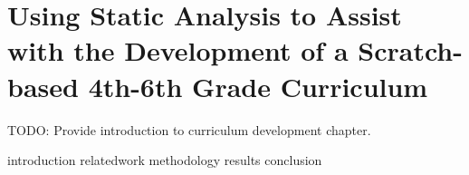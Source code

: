 \chapter{Using Static Analysis to Assist with the Development of a
  Scratch-based 4th-6th Grade Curriculum}
\label{chap:curriculum}

\def\currentprefix{curriculum}

TODO: Provide introduction to curriculum development chapter.

{introduction}
{relatedwork}
{methodology}
{results}
{conclusion}
